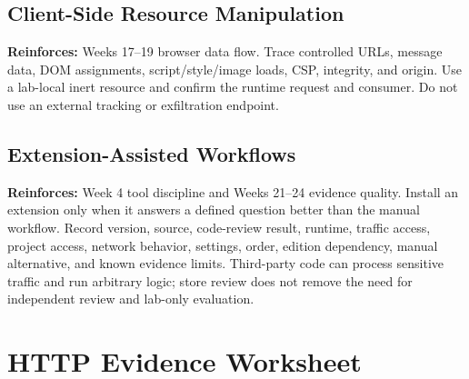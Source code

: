 \documentclass[11pt]{article}
\begin{document}
\subsection{Client-Side Resource Manipulation}
\begin{optionalbox}
\textbf{Reinforces:} Weeks 17--19 browser data flow. Trace controlled URLs,
message data, DOM assignments, script/style/image loads, CSP, integrity, and
origin. Use a lab-local inert resource and confirm the runtime request and consumer.
Do not use an external tracking or exfiltration endpoint.
\end{optionalbox}

\subsection{Extension-Assisted Workflows}
\begin{optionalbox}
\textbf{Reinforces:} Week 4 tool discipline and Weeks 21--24 evidence quality.
Install an extension only when it answers a defined question better than the
manual workflow. Record version, source, code-review result, runtime, traffic
access, project access, network behavior, settings, order, edition dependency,
manual alternative, and known evidence limits. Third-party code can process
sensitive traffic and run arbitrary logic; store review does not remove the need
for independent review and lab-only evaluation.
\end{optionalbox}

\section{HTTP Evidence Worksheet}
\end{document}
